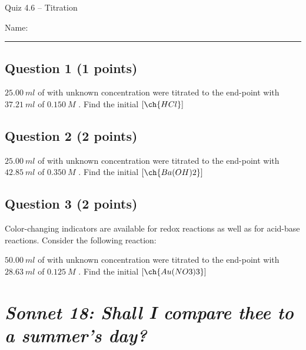 \documentclass[11pt, letterpaper]{memoir}
\begin{document}
	\begin{center}
		{\large	Quiz 4.6 -- Titration}
	\end{center}
{\large Name: \rule[-1mm]{4in}{.1pt}
	
	\subsection*{Question 1 (1 points)}
	$25.00~ml$ of  with unknown concentration were titrated to the end-point with $37.21~ml$ of $0.150~M$ . Find the initial $\left[\ch{HCl}\right]$
	
	\vspace{9em}
	\subsection*{Question 2 (2 points)}
	$25.00~ml$ of  with unknown concentration were titrated to the end-point with $42.85~ml$ of $0.350~M$ . Find the initial $\left[\ch{Ba(OH)2}\right]$
	
	\vspace{10em}
	\subsection*{Question 3 (2 points)}
	Color-changing indicators are available for redox reactions as well as for acid-base reactions. Consider the following reaction:
	
	
	\noindent $50.00~ml$ of  with unknown concentration were titrated to the end-point with $28.63~ml$ of $0.125~M$ . Find the initial $\left[\ch{Au(NO3)3}\right]$

\newpage
\pagestyle{empty}
\addtocounter{page}{-1}
\section*{\emph{Sonnet 18: Shall I compare thee to a summer’s day?}}
}
\end{document}
